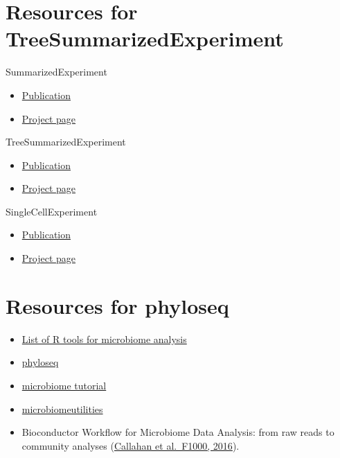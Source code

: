 \documentclass[
  oneside]{book}
\providecommand{\tightlist}{%
  \setlength{\itemsep}{0pt}\setlength{\parskip}{0pt}}
\begin{document}
\hypertarget{resources-for-treesummarizedexperiment}{%
\section{Resources for TreeSummarizedExperiment}\label{resources-for-treesummarizedexperiment}}

SummarizedExperiment

\begin{itemize}
\tightlist
\item
  \href{https://bioconductor.org/packages/release/bioc/vignettes/SummarizedExperiment/inst/doc/SummarizedExperiment.html}{Publication}
\item
  \href{https://bioconductor.org/packages/release/bioc/html/SummarizedExperiment.html}{Project page}
\end{itemize}

TreeSummarizedExperiment

\begin{itemize}
\tightlist
\item
  \href{https://f1000research.com/articles/9-1246}{Publication}
\item
  \href{https://www.bioconductor.org/packages/release/bioc/html/TreeSummarizedExperiment.html}{Project page}
\end{itemize}

SingleCellExperiment

\begin{itemize}
\tightlist
\item
  \href{https://bioconductor.org/packages/release/bioc/vignettes/SingleCellExperiment/inst/doc/intro.html}{Publication}
\item
  \href{https://bioconductor.org/packages/release/bioc/html/SingleCellExperiment.html}{Project page}
\end{itemize}

\hypertarget{resources-for-phyloseq}{%
\section{Resources for phyloseq}\label{resources-for-phyloseq}}

\begin{itemize}
\tightlist
\item
  \href{https://microsud.github.io/Tools-Microbiome-Analysis/}{List of R tools for microbiome analysis}
\item
  \href{http://journals.plos.org/plosone/article?id=10.1371/journal.pone.0061217}{phyloseq}
\item
  \href{http://microbiome.github.io/tutorials/}{microbiome tutorial}
\item
  \href{https://microsud.github.io/microbiomeutilities/}{microbiomeutilities}
\item
  Bioconductor Workflow for Microbiome Data Analysis: from raw reads to community analyses (\href{https://f1000research.com/articles/5-1492/v2}{Callahan et al.~F1000, 2016}).
\end{itemize}
\end{document}
